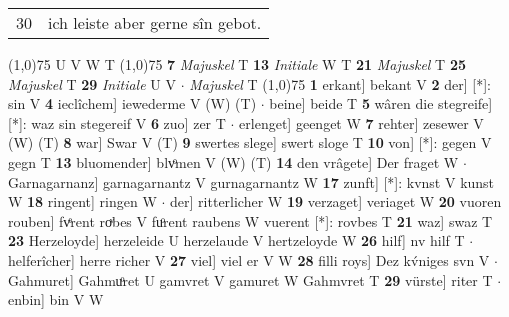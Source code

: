\documentclass[8pt,a4paper,notitlepage]{article}
\begin{document}
\begin{table}[ht]
\begin{minipage}[t]{0.5\linewidth}
\begin{tabular}{rl}
30 & ich leiste aber gerne sîn gebot.\\ 
\end{tabular}
\scriptsize
\line(1,0){75} \newline
U V W T \newline
\line(1,0){75} \newline
\textbf{7} \textit{Majuskel} T  \textbf{13} \textit{Initiale} W T  \textbf{21} \textit{Majuskel} T  \textbf{25} \textit{Majuskel} T  \textbf{29} \textit{Initiale} U V   $\cdot$ \textit{Majuskel} T  \newline
\line(1,0){75} \newline
\textbf{1} erkant] bekant V \textbf{2} der] [*]: sin V \textbf{4} ieclîchem] iewederme V (W) (T)  $\cdot$ beine] beide T \textbf{5} wâren die stegreife] [*]: waz sin stegereif V \textbf{6} zuo] zer T  $\cdot$ erlenget] geenget W \textbf{7} rehter] zesewer V (W) (T) \textbf{8} war] Swar V (T) \textbf{9} swertes slege] swert sloge T \textbf{10} von] [*]: gegen V gegn T \textbf{13} bluomender] blvͦmen V (W) (T) \textbf{14} den vrâgete] Der fraget W  $\cdot$ Garnagarnanz] garnagarnantz V gurnagarnantz W \textbf{17} zunft] [*]: kvnst V kunst W \textbf{18} ringent] ringen W  $\cdot$ der] ritterlicher W \textbf{19} verzaget] veriaget W \textbf{20} vuoren rouben] fvͤrent roͮbes V fuͦrent raubens W vuerent [*]: rovbes T \textbf{21} waz] swaz T \textbf{23} Herzeloyde] herzeleide U herzelaude V hertzeloyde W \textbf{26} hilf] nv hilf T  $\cdot$ helferîcher] herre richer V \textbf{27} viel] viel er V W \textbf{28} filli roys] Dez kv́niges svn V  $\cdot$ Gahmuret] Gahmuͦret U gamvret V gamuret W Gahmvret T \textbf{29} vürste] riter T  $\cdot$ enbin] bin V W \newline
\end{minipage}
\end{table}
\end{document}

